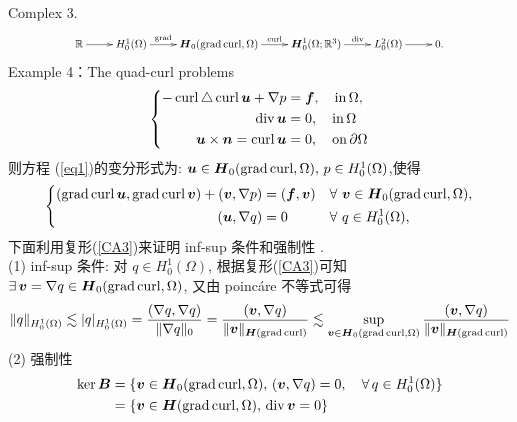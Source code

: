 Complex 3.
\begin{equation}\label{CA3}
	\resizebox{0.8\hsize}{!}{$
		\begin{array}{c}
			\xymatrix{	
\mathbb{R} \ar[r] & H_0^{1}(\Omega)\ar[r]^-{\grad} & \boldsymbol{H}_{0}(\grad\curl,\Omega)  \ar[r]^-{\curl}
				& \boldsymbol{H}_{0}^{1}(\Omega;\mathbb{R}^{3})    \ar[r]^-{\div} & L_{0}^2(\Omega) \ar[r]^{} & 0 .
 }
		\end{array}
		$}
	\end{equation}
Example 4：The quad-curl problems
\begin{equation}\label{eq1}
\left\{
\begin{aligned}
-\operatorname{curl}\triangle\operatorname{curl} \boldsymbol{u} + \nabla p &=\boldsymbol{f},\quad \mathrm{in}\,\Omega,\\
\operatorname{div} \boldsymbol{u}&=0, \quad \mathrm{in}\,\Omega\\
\boldsymbol{u}\times \boldsymbol{n}=\operatorname{curl}\boldsymbol{u}&=0,\quad \mathrm{on}\,\partial\Omega
\end{aligned}
\right.
\end{equation}
则方程 (\ref{eq1})的变分形式为: $\boldsymbol{u}\in\boldsymbol{H}_{0}(\operatorname{grad}\operatorname{curl},\Omega),\,p\in H_0^{1}(\Omega)$,使得
\begin{equation}\label{Cq1}
\left\{
\begin{aligned}
(\operatorname{grad}\operatorname{curl}\boldsymbol{u},\operatorname{grad}\operatorname{curl}\boldsymbol{v})+(\boldsymbol{v},\nabla p)&=(\boldsymbol{f},\boldsymbol{v})
  &&\forall \,\, \boldsymbol{v}\in \boldsymbol{H}_{0}(\operatorname{grad}\operatorname{curl},\Omega),
 \\
 ( \boldsymbol{u},\nabla  q) &=0 &&\forall \,\, q\in H_0^{1}(\Omega),
\end{aligned}\right.
\end{equation}
下面利用复形(\ref{CA3})来证明 inf-sup 条件和强制性 .\\
(1) inf-sup 条件: 对 $q\in H_0^{1}(\Omega)$, 根据复形(\ref{CA3})可知 $ \exists\,\boldsymbol{v}=\nabla q\in \boldsymbol{H}_{0}(\operatorname{grad}\operatorname{curl},\Omega)$,
又由 poinc\'{a}re 不等式可得
\begin{align*}
\|q\|_{ H_0^{1}(\Omega)}\lesssim |q|_{ H_0^{1}(\Omega)}=\frac{(\nabla q,\nabla q)}{\|\nabla q\|_{0}}
=\frac{(\boldsymbol{v},\nabla q)}{\|\boldsymbol{v}\|_{\boldsymbol{H}(\operatorname{grad}\operatorname{curl})}}\lesssim\sup_{\boldsymbol{v}\in\boldsymbol{H}_0(\operatorname{grad}\operatorname{curl}, \Omega)}\frac{(\boldsymbol{v},\nabla q)}{\|\boldsymbol{v}\|_{\boldsymbol{H}(\operatorname{grad}\operatorname{curl})}}
\end{align*}
(2) 强制性
\begin{align*}
\ker \boldsymbol{B}
&=\{\boldsymbol{v}\in \boldsymbol{H}_0(\operatorname{grad}\operatorname{curl}, \Omega),\,(\boldsymbol{v},\nabla q)=0,\quad\forall \, q\in H_0^{1}(\Omega)\}\\
&=\{\boldsymbol{v}\in \boldsymbol{H}(\operatorname{grad}\operatorname{curl}, \Omega),\,\operatorname{div}\boldsymbol{v}=0\}
\end{align*}
